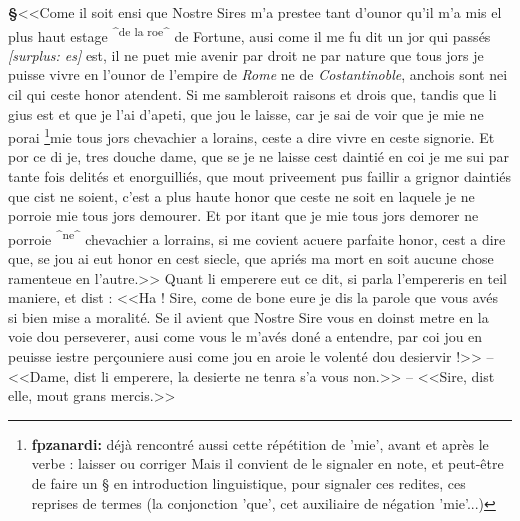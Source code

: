 \documentclass[12pt]{article} %
\newcommand{\colmar}[1]{\marginnote{[#1]}}          %
\newcommand{\placeName}[1]{\emph{#1}} %
\newcommand{\add}[1]{\textsuperscript{#1}}       %
\newcommand{\supplied}[1]{\textlangle#1\textrangle} %
\newcommand{\fnfpz}[1]{\footnote{\textbf{fpzanardi:} #1}} %
\newcommand{\surplus}[1]{\textit{[surplus: #1]}} %
\newcounter{paranum}
\newcommand{\pnum}{\stepcounter{paranum}\textbf{§\arabic{paranum}}\quad}
\begin{document}
\pnum <<Come il soit ensi que N\supplied{ost}re Sires m'a prestee tant d'ounor qu'il m'a mis el plus haut estage \add{^de la roe^} de Fortune, ausi come il me fu dit un jor qui passés \surplus{es} est, il ne puet mie avenir par droit ne par nature que tous \colmar{8rb}\colmar{b} jors je puisse vivre en l'ounor de l'empire de \placeName{Rome} ne de \placeName{Costantinoble}, anchois sont nei cil qui ceste honor atendent. S\supplied{i} me sambleroit raiso\supplied{n}s et drois que, tandis que li gius est et que je l'ai d'apeti, que jou le laisse, car je sai de voir que je mie ne porai \fnfpz{déjà rencontré aussi cette répétition de 'mie', avant et après le verbe : laisser ou corriger Mais il convient de le signaler en note, et peut-être de faire un § en introduction linguistique, pour signaler ces redites, ces reprises de termes (la conjonction 'que', cet auxiliaire de négation 'mie'...)}mie tous jors chevachier a lorains, ceste a dire vivre en ceste signorie. Et por ce di je, tres douche dame, que se je ne laisse cest daintié en coi je me sui par tante fois delités et enorguilliés, que mout priveement pus faillir a grignor daintiés que cist ne soient, c'est a plus haute honor que ceste ne soit en laquele je ne porroie mie tous jors demourer. Et por itant que je mie tous jors demorer ne porroie \add{^ne^} chevachier a lorrains, si me covient acuere parfaite honor, cest a dire que, se jou ai eut honor en cest siecle, que apriés ma mort en soit aucune chose ramenteue en l'autre.>> Quant li emperere eut ce dit, si parla l'empereris en teil maniere, et dist : <<Ha ! Sire, come de bone eure je dis la parole que vous avés si bien mise a moralité. Se il avient que Nostre Sire vous en doinst metre en la voie dou perseverer, ausi come vous le m'avés doné a entendre, par coi jou en peuisse iestre perçouniere ausi come jou en aroie le volenté dou desiervir !>> -- <<Dame, dist li emperere, la desierte ne tenra s'a vous non.>> -- <<Sire, dist elle, mout grans mercis.>>
\end{document}
